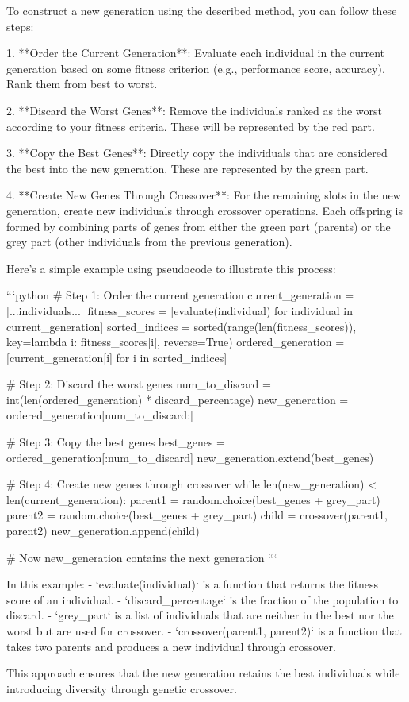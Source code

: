 To construct a new generation using the described method, you can follow these steps:

1. **Order the Current Generation**: Evaluate each individual in the current generation based on some fitness criterion (e.g., performance score, accuracy). Rank them from best to worst.

2. **Discard the Worst Genes**: Remove the individuals ranked as the worst according to your fitness criteria. These will be represented by the red part.

3. **Copy the Best Genes**: Directly copy the individuals that are considered the best into the new generation. These are represented by the green part.

4. **Create New Genes Through Crossover**: For the remaining slots in the new generation, create new individuals through crossover operations. Each offspring is formed by combining parts of genes from either the green part (parents) or the grey part (other individuals from the previous generation).

Here's a simple example using pseudocode to illustrate this process:

```python
# Step 1: Order the current generation
current_generation = [...individuals...]
fitness_scores = [evaluate(individual) for individual in current_generation]
sorted_indices = sorted(range(len(fitness_scores)), key=lambda i: fitness_scores[i], reverse=True)
ordered_generation = [current_generation[i] for i in sorted_indices]

# Step 2: Discard the worst genes
num_to_discard = int(len(ordered_generation) * discard_percentage)
new_generation = ordered_generation[num_to_discard:]

# Step 3: Copy the best genes
best_genes = ordered_generation[:num_to_discard]
new_generation.extend(best_genes)

# Step 4: Create new genes through crossover
while len(new_generation) < len(current_generation):
    parent1 = random.choice(best_genes + grey_part)
    parent2 = random.choice(best_genes + grey_part)
    child = crossover(parent1, parent2)
    new_generation.append(child)

# Now new_generation contains the next generation
```

In this example:
- `evaluate(individual)` is a function that returns the fitness score of an individual.
- `discard_percentage` is the fraction of the population to discard.
- `grey_part` is a list of individuals that are neither in the best nor the worst but are used for crossover.
- `crossover(parent1, parent2)` is a function that takes two parents and produces a new individual through crossover.

This approach ensures that the new generation retains the best individuals while introducing diversity through genetic crossover.